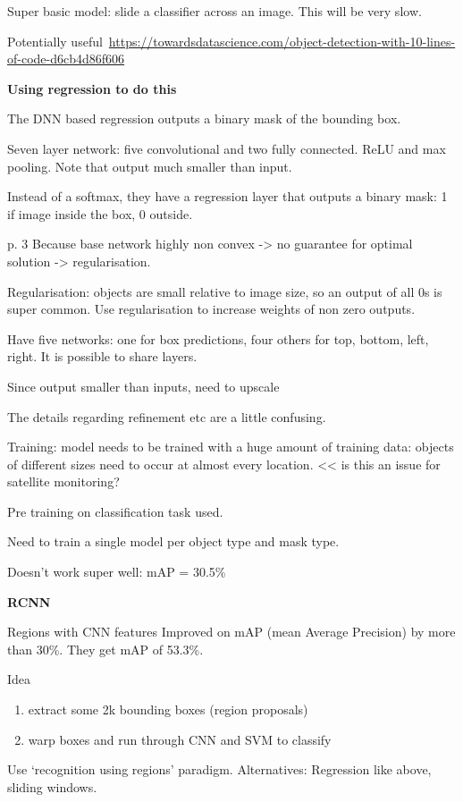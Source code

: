 \documentclass[12pt, a4paper, oneside, headinclude, footinclude]{article}
\begin{document}
Super basic model: slide a classifier across an image. This will be very slow.

Potentially
useful~\url{https://towardsdatascience.com/object-detection-with-10-lines-of-code-d6cb4d86f606}

\textbf{Using regression to do this}~\cite{NIPS2013_5207}

The DNN based regression outputs a binary mask of the bounding box. 

Seven layer network: five convolutional and two fully connected. ReLU and max
pooling. Note that output much smaller than input.

Instead of a softmax, they have a regression layer that outputs a binary mask:
1 if image inside the box, 0 outside.\ 

p. 3 Because base network highly non convex -> no guarantee for optimal solution ->
regularisation.

Regularisation: objects are small relative to image size, so an output of all
0s is super common. Use regularisation to increase weights of non zero
outputs.

Have five networks: one for box predictions, four others for {top, bottom,
left, right}. 
It is possible to share layers. 

Since output smaller than inputs, need to upscale

The details regarding refinement etc are a little confusing. 

Training: model needs to be trained with a huge amount of training data:
objects of different sizes need to occur at almost every location. << is this
an issue for satellite monitoring?

Pre training on classification task used.

Need to train a single model per object type and mask type.

Doesn't work super well: mAP = 30.5\%

\textbf{RCNN}~\cite{Girshick2014, Girshick2015}

Regions with CNN features
Improved on mAP (mean Average Precision) by more than 30\%. They get mAP of
53.3\%. 

Idea
\begin{enumerate}
    \item extract some 2k bounding boxes (region proposals)
    \item warp boxes and run through CNN and SVM to classify
\end{enumerate}

Use `recognition using regions' paradigm.
Alternatives: Regression like above, sliding windows.
\end{document}
